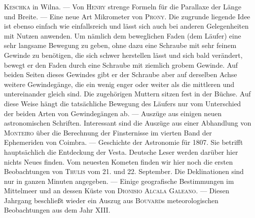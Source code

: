 \textsc{Keschka} in Wilna. --- Von \textsc{Henry} strenge Formeln für die Parallaxe der Länge und
 Breite. --- Eine neue Art Mikrometer von \textsc{Prony}. Die zugrunde liegende Idee ist ebenso einfach wie einfallsreich und lässt sich auch bei anderen Gelegenheiten mit Nutzen anwenden. Um nämlich dem beweglichen Faden (dem Läufer) eine sehr langsame Bewegung zu geben, ohne dazu eine Schraube mit sehr feinem Gewinde zu benötigen, die sich schwer herstellen lässt und sich bald verändert, bewegt er den Faden durch eine Schraube mit ziemlich grobem Gewinde. Auf beiden Seiten dieses Gewindes gibt er der Schraube aber auf derselben Achse weitere Gewindegänge, die ein wenig enger oder weiter als die mittleren und untereinander gleich sind. Die zugehörigen Muttern sitzen fest in der Büchse. Auf diese Weise hängt die tatsächliche Bewegung des Läufers nur vom Unterschied der beiden Arten von Gewindegängen ab. --- Auszüge aus einigen neuen astronomischen Schriften. Interessant sind die Auszüge aus einer Abhandlung von \textsc{Monteiro} über die Berechnung der Finsternisse im vierten Band der Ephemeriden von Coimbra. --- Geschichte der Astronomie für 1807. Sie betrifft hauptsächlich die Entdeckung der Vesta. Deutsche Leser werden darüber hier nichts Neues finden. Vom neuesten Kometen finden wir hier noch die ersten Beobachtungen von \textsc{Thulis} vom 21. und 22. September. Die Deklinationen sind nur in ganzen Minuten angegeben. --- Einige geografische Bestimmungen im Mittelmeer und an dessen Küste von \textsc{Dionisio Alcala Galeano}. --- Diesen Jahrgang beschließt wieder ein Auszug aus \textsc{Bouvard}s meteorologischen Beobachtungen aus dem Jahr XIII.

